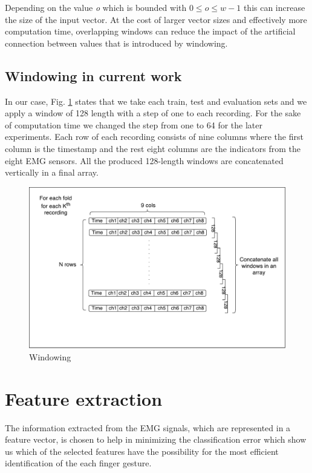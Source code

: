 Depending on the value \textit{o} which is bounded with $0 \leq o \leq w-1$ this can increase  the size of the input vector. At the cost of larger vector sizes and effectively more computation time, overlapping windows  can reduce the impact of the artificial connection between values that is introduced by windowing. \\
\subsection{Windowing in current work}
In our case, Fig. \ref{fig:windowing} states that we take each train, test and evaluation sets and we apply a window of 128 length with a step of one to each recording. For the sake of computation time we changed the step from one to 64 for the later experiments. Each row of each recording consists of nine columns where the first column is the timestamp and the rest eight columns are the indicators from the eight \ac{EMG} sensors. All the produced 128-length windows are concatenated vertically in a final array.
\begin{figure}[h!]
\includegraphics[width=15cm,left,keepaspectratio]{figures/windowing}
\caption{Windowing}
\label{fig:windowing}
\end{figure}

\section{Feature extraction}
The information extracted from the \ac{EMG} signals, which are represented in a feature vector, is chosen to help in minimizing the classification error which show us which of the selected features have the possibility for the most efficient identification of the each finger gesture. \\

